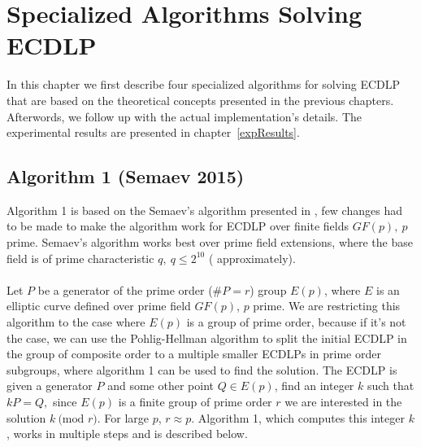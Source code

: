 \documentclass[thesis=M,english]{FITthesis}[2012/10/20]
\theoremstyle{remark}
\theoremstyle{definition}
\begin{document}
\chapter{Specialized Algorithms Solving ECDLP}
\label{specAlg}
In this chapter we first describe four specialized algorithms for solving ECDLP that are based on the theoretical concepts presented in the previous chapters. Afterwords, we follow up with the actual implementation's details. The experimental results are presented in chapter~\ref{expResults}.
\section{Algorithm 1 (Semaev 2015)}
Algorithm 1 is based on the Semaev's algorithm presented in \cite{semaev15}, few changes had to be made to make the algorithm work for ECDLP over finite fields $GF(p),\ p$ prime. Semaev's algorithm works best over prime field extensions, where the base field is of prime characteristic $q,\ q \leq 2^{10}$ ( approximately).  \\ \\
\noindent Let $P$ be a generator of the prime order ($\#P = r$) group $E(p)$, where $E$ is an elliptic curve defined over prime field $GF(p)$, $p$ prime. We are restricting this algorithm to the case where $E(p)$ is a group of prime order, because if it's not the case, we can use the Pohlig-Hellman algorithm to split the initial ECDLP in the group of composite order to a multiple smaller ECDLPs in prime order subgroups, where algorithm 1 can be used to find the solution. The ECDLP is given a generator $P$ and some other point $Q \in E(p)$, find an integer $k$ such that $kP = Q,$ since $E(p)$ is a finite group of prime order $r$ we are interested in the solution $k\ \text{(mod }r)$. For large $p$, $r \approx p$. Algorithm 1, which computes this integer $k$, works in multiple steps and is described below.
\end{document}
